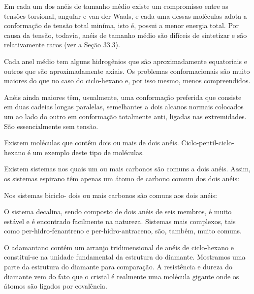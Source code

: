 Em cada um dos anéis de tamanho médio existe um compromisso entre as tensões torsional, angular e van der Waals, e cada uma dessas moléculas adota a conformação de tensão total miníma, isto é, possui a menor energia total. Por causa da tensão, todavia, anéis de tamanho médio são difíceis de sintetizar e são relativamente raros (ver a Seção 33.3).

Cada anel médio tem alguns hidrogênios que são aproximadamente equatoriais e outros que são aproximadamente axiais. Os problemas conformacionais são muito maiores do que no caso do ciclo-hexano e, por isso mesmo, menos compreendidos.

Anéis ainda maiores têm, usualmente, uma conformação preferida que consiste em duas cadeias longas paralelas, semelhantes a dois alcanos normais colocados um ao lado do outro em conformação totalmente anti, ligadas nas extremidades. São essencialmente sem tensão. 

Existem moléculas que contêm dois ou mais de dois anéis. Ciclo-pentil-ciclo-hexano é um exemplo deste tipo de moléculas.

Existem sistemas nos quais um ou mais carbonos são comuns a dois anéis. Assim, os sistemas espirano têm apenas um átomo de carbono comum dos dois anéis:

Nos sistemas biciclo- dois ou mais carbonos são comuns aos dois anéis:

O sistema decalina, sendo composto de dois anéis de seis membros, é muito estável e é encontrado facilmente na natureza. Sistemas mais complexos, tais como per-hidro-fenantreno e per-hidro-antraceno, são, também, muito comuns.

O adamantano contém um arranjo tridimensional de anéis de ciclo-hexano e constitui-se na unidade fundamental da estrutura do diamante. Mostramos uma parte da estrutura do diamante para comparação. A resistência e dureza do diamante vem do fato que o cristal é realmente uma molécula gigante onde os átomos são ligados por covalência.
